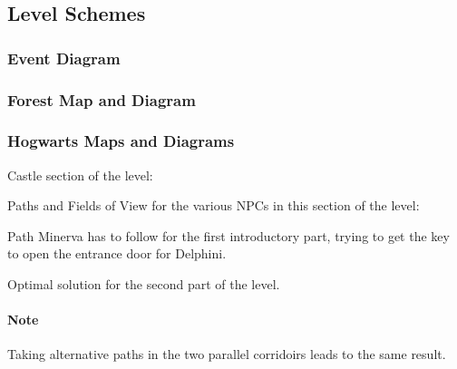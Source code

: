 \pagebreak

\subsection{Level Schemes}

\subsubsection{Event Diagram}

\subsubsection{Forest Map and Diagram}

\subsubsection{Hogwarts Maps and Diagrams}

Castle section of the level:

Paths and Fields of View for the various NPCs in this section of the level:

Path Minerva has to follow for the first introductory part, trying to get the key to open the entrance door for Delphini.

Optimal solution for the second part of the level. 

\paragraph{Note} Taking alternative paths in the two parallel corridoirs leads to the same result.
